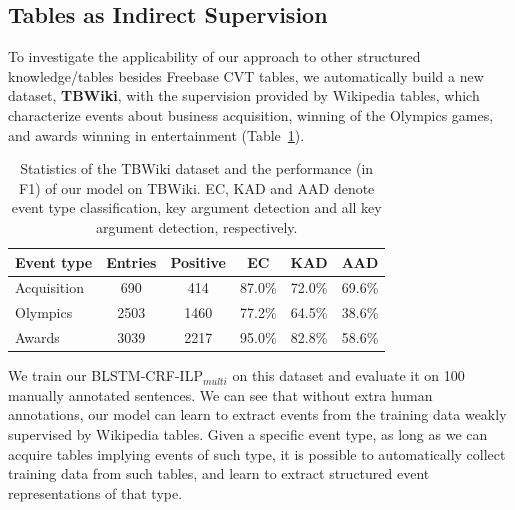 \subsection{Tables as Indirect Supervision}
To investigate the applicability of our approach to other structured knowledge/tables besides Freebase CVT tables, %
we automatically build a new dataset, \textbf{TBWiki}, with the supervision provided by Wikipedia tables, which characterize events about business acquisition, winning of the Olympics games, and awards winning in entertainment (Table~\ref{tab:6}).

\begin{table}[h]
\scriptsize
\centering
\begin{tabular}{|l|c|c|c|c|c|} \hline
	Event type & Entries & Positive & EC & KAD & AAD \\ \hline
	Acquisition & 690 & 414 & 87.0\% & 72.0\% & 69.6\% \\ \hline
	Olympics & 2503 & 1460 & 77.2\% & 64.5\% & 38.6\% \\ \hline
	Awards & 3039 & 2217 & 95.0\% & 82.8\% & 58.6\% \\ \hline
\end{tabular}
\caption{Statistics of the TBWiki dataset and the performance (in F1) of our model on TBWiki. 
EC, KAD and AAD denote event type classification, key argument detection and all key argument detection, respectively.
\label{tab:6}}
\end{table}

We train our BLSTM-CRF-ILP$_{multi}$ on this dataset and evaluate it on 100 manually annotated sentences.
We can see that without extra human annotations, %
our model can learn to extract events from the training data weakly supervised by Wikipedia tables. Given a specific event type, as long as we can acquire tables implying events of such type, it is possible to automatically collect training data from such tables, and learn to extract structured event representations of that type. %
